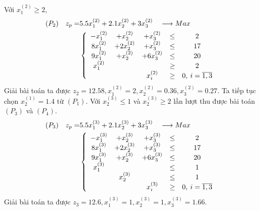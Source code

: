 \documentclass[12pt,a4paper]{report}
\begin{document}
    Với $x^{(2)}_1 \geq 2$, \\
    \begin{equation*}
      \begin{split}
        (P_2) \quad z_p= & 5.5x^{(2)}_1 + 2.1x^{(2)}_2 + 3x^{(2)}_3 \quad \longrightarrow Max \\
        & \left\{\begin{array} {ccccc}
         -x^{(2)}_1 &+ x^{(2)}_2 &+ x^{(2)}_3 &\leq &2 \\
         8x^{(2)}_1 &+ 2x^{(2)}_2 &+ x^{(2)}_3&\leq& 17 \\
         9x^{(2)}_1 &+ x^{(2)}_2 &+ 6x^{(2)}_3 &\leq &20 \\
         x^{(2)}_1 &&&\geq& 2 \\
        &&x^{(2)}_i &\geq &0 , \: i=\overline{\rm 1 ,3} \\
        \end{array}\right. \\
    \end{split}
    \end{equation*}
    Giải bài toán ta được $z_2=12.58, x^{(2)}_1=2, x^{(2)}_2=0.36, x^{(2)}_3=0.27$. Ta tiếp tục chọn $x^{(1)}_2=1.4$ từ $(P_1)$. Với $x^{(3)}_2 \leq 1$ và $x^{(3)}_2 \geq 2$ lần lượt thu được bài toán $(P_3)$ và $(P_4)$.
    \begin{equation*}
      \begin{split}
          (P_3) \quad z_p= & 5.5x^{(3)}_1 + 2.1x^{(3)}_2 + 3x^{(3)}_3 \quad \longrightarrow Max \\
          & \left\{\begin{array} {ccccc}
           -x^{(3)}_1 &+ x^{(3)}_2 &+ x^{(3)}_3 &\leq& 2 \\
           8x^{(3)}_1 &+ 2x^{(3)}_2 &+ x^{(3)}_3&\leq& 17 \\
           9x^{(3)}_1 &+ x^{(3)}_2 &+ 6x^{(3)}_3 &\leq& 20 \\
           x^{(3)}_1 &&&\leq &1 \\
           &x^{(3)}_2&& \leq &1 \\
          &&x^{(3)}_i &\geq& 0 , \: i=\overline{\rm 1 ,3} \\
          \end{array}\right. \\
      \end{split}
    \end{equation*}
    Giải bài toán ta được $z_3=12.6, x^{(3)}_1=1, x^{(3)}_2=1, x^{(3)}_3=1.66$.
\end{document}
